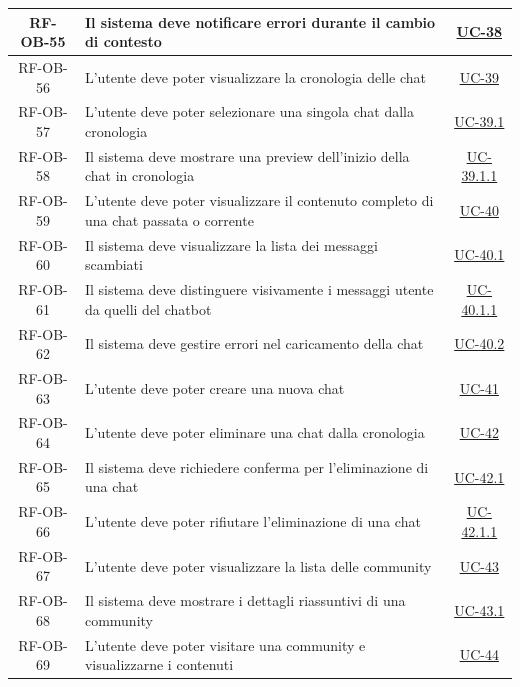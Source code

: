 \documentclass[a4paper,12pt]{article}
\begin{document}
\begin{center}
\begin{longtable}{|c|p{9cm}|c|}
\hline
\rowcolor{white}
RF-OB-55 & Il sistema deve notificare errori durante il cambio di contesto & \hyperref[sec:UC-38]{UC-38} \\
\hline
\rowcolor{gray!20}
RF-OB-56 & L'utente deve poter visualizzare la cronologia delle chat & \hyperref[subsec:UC-39]{UC-39} \\
\hline
\rowcolor{white}
RF-OB-57 & L'utente deve poter selezionare una singola chat dalla cronologia & \hyperref[subsec:UC-39.1]{UC-39.1} \\
\hline
\rowcolor{gray!20}
RF-OB-58 & Il sistema deve mostrare una preview dell'inizio della chat in cronologia & \hyperref[subsec:UC-39.1.1]{UC-39.1.1} \\
\hline
\rowcolor{white}
RF-OB-59 & L'utente deve poter visualizzare il contenuto completo di una chat passata o corrente & \hyperref[subsec:UC-40]{UC-40} \\
\hline
\rowcolor{gray!20}
RF-OB-60 & Il sistema deve visualizzare la lista dei messaggi scambiati & \hyperref[subsec:UC-40.1]{UC-40.1} \\
\hline
\rowcolor{white}
RF-OB-61 & Il sistema deve distinguere visivamente i messaggi utente da quelli del chatbot & \hyperref[subsec:UC-40.1.1]{UC-40.1.1} \\
\hline
\rowcolor{gray!20}
RF-OB-62 & Il sistema deve gestire errori nel caricamento della chat & \hyperref[subsec:UC-40.2]{UC-40.2} \\
\hline
\rowcolor{white}
RF-OB-63 & L'utente deve poter creare una nuova chat & \hyperref[subsec:UC-41]{UC-41} \\
\hline
\rowcolor{gray!20}
RF-OB-64 & L'utente deve poter eliminare una chat dalla cronologia & \hyperref[subsec:UC-42]{UC-42} \\
\hline
\rowcolor{white}
RF-OB-65 & Il sistema deve richiedere conferma per l'eliminazione di una chat & \hyperref[subsec:UC-42.1]{UC-42.1} \\
\hline
\rowcolor{gray!20}
RF-OB-66 & L'utente deve poter rifiutare l'eliminazione di una chat & \hyperref[subsec:UC-42.1.1]{UC-42.1.1} \\
\hline
\rowcolor{white}
RF-OB-67 & L'utente deve poter visualizzare la lista delle community & \hyperref[sec:UC-43]{UC-43} \\
\hline
\rowcolor{gray!20}
RF-OB-68 & Il sistema deve mostrare i dettagli riassuntivi di una community & \hyperref[subsec:UC-43.1]{UC-43.1} \\
\hline
\rowcolor{white}
RF-OB-69 & L'utente deve poter visitare una community e visualizzarne i contenuti & \hyperref[sec:UC-44]{UC-44} \\

\end{longtable}
\end{center}
\end{document}
